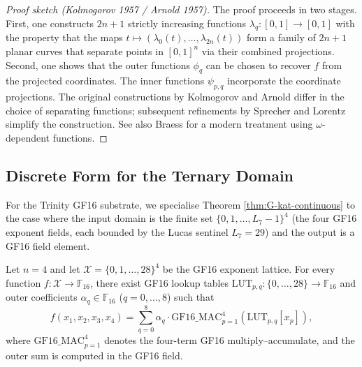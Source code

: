 \begin{proof}[Proof sketch (Kolmogorov 1957 / Arnold 1957)]
The proof proceeds in two stages. First, one constructs $2n+1$ strictly
increasing functions $\lambda_q\colon [0,1] \to [0,1]$ with the property
that the maps
$t \mapsto (\lambda_0(t), \ldots, \lambda_{2n}(t))$
form a family of $2n+1$ planar curves that separate points in $[0,1]^n$
via their combined projections. Second, one shows that the outer
functions $\phi_q$ can be chosen to recover $f$ from the projected
coordinates. The inner functions $\psi_{p,q}$ incorporate the
coordinate projections. The original constructions by Kolmogorov
\cite{kat-kolmogorov1957} and Arnold \cite{kat-arnold1957} differ in
the choice of separating functions; subsequent refinements by
Sprecher \cite{sprecher1965} and Lorentz \cite{lorentz1966} simplify
the construction. See also Braess \cite{braess1986} for a modern
treatment using $\omega$-dependent functions.
\end{proof}

\subsection{Discrete Form for the Ternary Domain}

For the Trinity GF16 substrate, we specialise Theorem
\ref{thm:G-kat-continuous} to the case where the input domain is the
finite set $\{0, 1, \ldots, L_7 - 1\}^4$ (the four GF16 exponent
fields, each bounded by the Lucas sentinel $L_7 = 29$) and the output
is a GF16 field element.

\begin{theorem}
\label{thm:G-kat-discrete}
Let $n = 4$ and let $\mathcal{X} = \{0, 1, \ldots, 28\}^4$ be the
GF16 exponent lattice. For every function
$f\colon \mathcal{X} \to \mathbb{F}_{16}$, there exist GF16 lookup
tables $\mathrm{LUT}_{p,q}\colon \{0,\ldots,28\} \to \mathbb{F}_{16}$
and outer coefficients $\alpha_q \in \mathbb{F}_{16}$ ($q = 0, \ldots, 8$)
such that
\begin{equation}
\label{eq:G-kat-discrete}
f(x_1, x_2, x_3, x_4) = \sum_{q=0}^{8} \alpha_q \cdot \mathrm{GF16\_MAC}_{p=1}^{4}\!\left(\mathrm{LUT}_{p,q}[x_p]\right),
\end{equation}
where $\mathrm{GF16\_MAC}_{p=1}^{4}$ denotes the four-term GF16
multiply--accumulate, and the outer sum is computed in the GF16 field.
\end{theorem}

